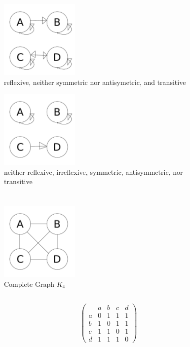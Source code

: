 \documentclass[10pt,reqno,sumlimits]{amsart}
\theoremstyle{plain}
\theoremstyle{definition}
\newcommand{\1}{{\bf 1}}
\numberwithin{equation}{section}
\begin{document}
\begin{figure}[htbp]
\centerline{
    \mbox{\includegraphics[width=1.5in]{1_d.pdf}}
  }
  \caption{reflexive, neither symmetric nor antisymetric, and transitive}
\end{figure}

\begin{figure}[htbp]
\centerline{
    \mbox{\includegraphics[width=1.5in]{1_e.pdf}}
  }
  \caption{neither reflexive, irreflexive, symmetric, antisymmetric, nor transitive}
\end{figure}
\clearpage

\section{}
\subsection{}
\begin{figure}[h]
\centerline{
    \mbox{\includegraphics[width=1.5in]{2_a.pdf}}
  }
  \caption{Complete Graph $K_4$}
\end{figure}
\subsection{}
\[ \left( \begin{array}{ccccc}
\  & a & b & c & d \\
a & 0 & 1 & 1 & 1 \\
b & 1 & 0 & 1 & 1 \\
c & 1 & 1 & 0 & 1 \\
d & 1 & 1 & 1 & 0\end{array} \right) \]
\end{document}
